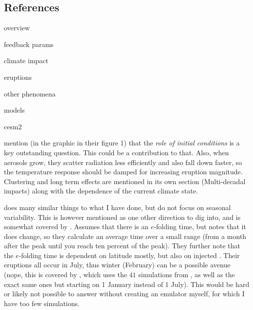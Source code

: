 \documentclass[twocol]{ametsocV5}
\begin{document}
\subsection*{References}

\begin{description}
  \item[overview] \citet{marshall2022}
  \item[feedback params] \citet{boer2007, gunther2022, gregory2020, hansen2005, knutti2017,
      marvel2016, merlis2014, ollila2016, pauling2021, richardson2019, salvi2022, wigley2005}
  \item[climate impact] \citet{gregory2016, jones2005, ottobliesner2016, santer2016,
      timmreck2009, timmreck2010, toohey2016b, yang2019, yokohata2005, zanchettin2019}
  \item[eruptions] \citet{arfeuille2014, douglass2006, lin2022, marshall2019, marshall2020,
      marshall2021, schmidt2018, soden2002, sukhodolov2018}
  \item[other phenomena] \citet{chen2022, lehner2016, marshall2018}
  \item[models] \citet{rypdal2012}
  \item[cesm2] \citet{danabasoglu2020, gettleman2019, lawrence2019, li2013, liu2016, mills2016,
      smith2010}
\end{description}

\citet{marshall2022} mention (in the graphic in their figure 1) that the \emph{role of
  initial conditions} is a key outstanding question. This could be a contribution to
that. Also, when aerosols grow, they scatter radiation less efficiently and also fall
down faster, so the temperature response should be damped for increasing eruption
magnitude. Clustering and long term effects are mentioned in its own section
(Multi-decadal impacts) along with the dependence of the current climate state.

\citet{marshall2019} does many similar things to what I have done, but do not focus on
seasonal variability. This is however mentioned as one other direction to dig into, and
is somewhat covered by \citet{marshall2020}. Assumes that there is an $e$-folding time,
but notes that it does change, so they calculate an average time over a small range
(from a month after the peak until you reach ten percent of the peak). They further note
that the $e$-folding time is dependent on latitude mostly, but also on injected
. Their eruptions all occur in July, thus winter (February) can be a possible
avenue (nope, this is covered by \citet{marshall2020}, which uses the \(41\) simulations
from \citet{marshall2019}, as well as the exact same ones but starting on 1 January
instead of 1 July). This would be hard or likely not possible to answer without creating
an emulator myself, for which I have too few simulations.
\end{document}
